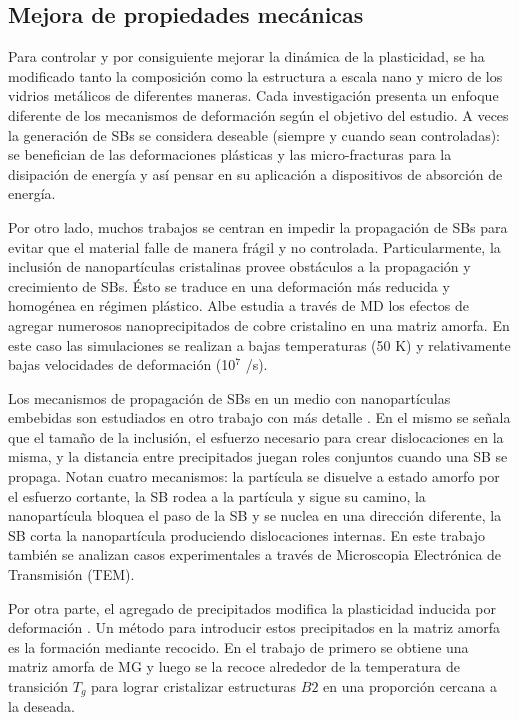 \subsection{Mejora de propiedades mecánicas}
\label{S1_2_3}

Para controlar y por consiguiente mejorar la dinámica de la plasticidad, se ha modificado tanto la composición como la estructura a escala nano y micro de los vidrios metálicos de diferentes maneras. Cada investigación presenta un enfoque diferente de los mecanismos de deformación según el objetivo del estudio. A veces la generación de SBs se considera deseable (siempre y cuando sean controladas): \cite{chen14} se benefician de las deformaciones plásticas y las micro-fracturas para la disipación de energía y así pensar en su aplicación a dispositivos de absorción de energía.

Por otro lado, muchos trabajos se centran en impedir la propagación de SBs para evitar que el material falle de manera frágil y no controlada. Particularmente, la inclusión de nanopartículas cristalinas provee obstáculos a la propagación y crecimiento de SBs. Ésto se traduce en una deformación más reducida y homogénea en régimen plástico. Albe \citep{albe13} estudia a través de MD los efectos de agregar numerosos nanoprecipitados de cobre cristalino en una matriz amorfa. En este caso las simulaciones se realizan a bajas temperaturas (50 K) y relativamente bajas velocidades de deformación (10$^{7}$ /s).

Los mecanismos de propagación de SBs en un medio con nanopartículas embebidas son estudiados en otro trabajo con más detalle \citep{brink15}. En el mismo se señala que el tamaño de la inclusión, el esfuerzo necesario para crear dislocaciones en la misma, y la distancia entre precipitados juegan roles conjuntos cuando una SB se propaga. Notan cuatro mecanismos: la partícula se disuelve a estado amorfo por el esfuerzo cortante, la SB rodea a la partícula y sigue su camino, la nanopartícula bloquea el paso de la SB y se nuclea en una dirección diferente, la SB corta la nanopartícula produciendo dislocaciones internas. En este trabajo también se analizan casos experimentales a través de Microscopia Electrónica de Transmisión (TEM).

Por otra parte, el agregado de precipitados modifica la plasticidad inducida por deformación \citep{kuo14}. Un método para introducir estos precipitados en la matriz amorfa es la formación mediante recocido. En el trabajo de \cite{wei14} primero se obtiene una matriz amorfa de MG y luego se la recoce alrededor de la temperatura de transición $T_{g}$ para lograr cristalizar estructuras $B2$ en una proporción cercana a la deseada.

